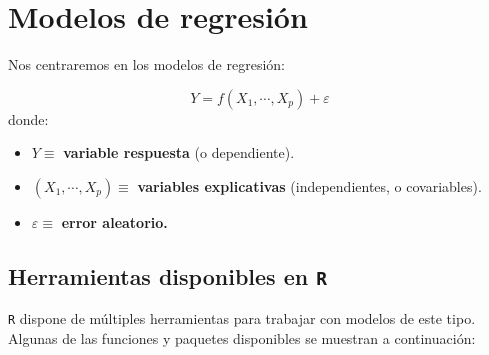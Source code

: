 \documentclass[]{book}
\begin{document}
\hypertarget{modelos-de-regresion}{%
\section{Modelos de regresión}\label{modelos-de-regresion}}

Nos centraremos en los modelos de regresión:

\[Y=f(X_{1},\cdots,X_{p})+\varepsilon\]
donde:

\begin{itemize}
\item
  \(Y\equiv\) \textbf{variable respuesta} (o dependiente).
\item
  \(\left( X_{1},\cdots,X_{p}\right) \equiv\) \textbf{variables
  explicativas} (independientes, o covariables).
\item
  \(\varepsilon\equiv\) \textbf{error aleatorio.}
\end{itemize}

\hypertarget{herramientas-disponibles-en-r}{%
\subsection{\texorpdfstring{Herramientas disponibles en \texttt{R}}{Herramientas disponibles en R}}\label{herramientas-disponibles-en-r}}

\texttt{R} dispone de múltiples herramientas para trabajar con modelos de este tipo. Algunas de las funciones y paquetes disponibles se muestran a continuación:
\end{document}
